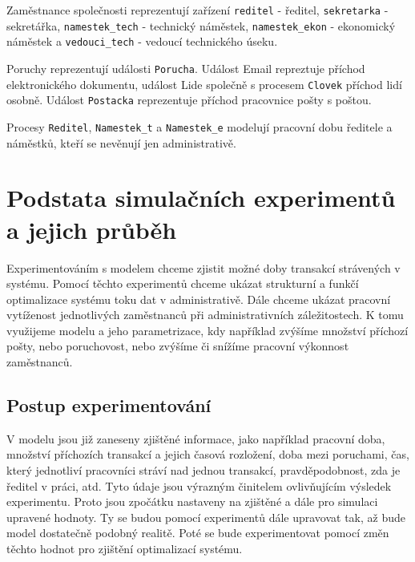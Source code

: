\documentclass[12pt,a4paper]{article}
\begin{document}
Zaměstnance společnosti reprezentují zařízení {\tt reditel} - ředitel, {\tt sekretarka} - sekretářka, {\tt namestek\_tech} - technický náměstek,
{\tt namestek\_ekon} - ekonomický náměstek a {\tt vedouci\_tech} - vedoucí technického úseku.

Poruchy reprezentují události {\tt Porucha}.
Událost Email repreztuje příchod elektronického dokumentu, událost Lide společně s procesem {\tt Clovek} příchod lidí osobně.
Událost {\tt Postacka} reprezentuje příchod pracovnice pošty s poštou.

Procesy {\tt Reditel}, {\tt Namestek\_t} a {\tt Namestek\_e} modelují pracovní dobu ředitele a náměstků, kteří se nevěnují jen administrativě.

\newpage


\section{Podstata simulačních experimentů a jejich průběh}

Experimentováním s modelem chceme zjistit možné doby transakcí strávených v sys\-té\-mu. Pomocí těchto experimentů chceme ukázat strukturní a funkčí optimalizace systému toku dat v administrativě. Dále chceme ukázat pracovní vytíženost jednotlivých za\-měst\-nan\-ců při administrativních záležitostech. K tomu využijeme modelu a jeho pa\-ra\-met\-ri\-za\-ce, kdy například zvýšíme množství příchozí pošty, nebo poruchovost, nebo zvýšíme či snížíme pracovní výkonnost zaměstnanců.

\subsection{Postup experimentování}
V modelu jsou již zaneseny zjištěné informace, jako například pracovní doba, množství příchozích transakcí a jejich časová rozložení, doba mezi poruchami, čas, který jednotliví pracovníci stráví nad jednou transakcí, pravděpodobnost, zda je ředitel v práci, atd. Tyto údaje jsou výrazným činitelem ovlivňujícím výsledek experimentu. Proto jsou zpočátku nastaveny na zjištěné a dále pro simulaci upravené hodnoty. Ty se budou pomocí experimentů dále upravovat tak, až bude model dostatečně podobný realitě. Poté se bude experimentovat pomocí změn těchto hodnot pro zjištění optimalizací systému.
\end{document}
